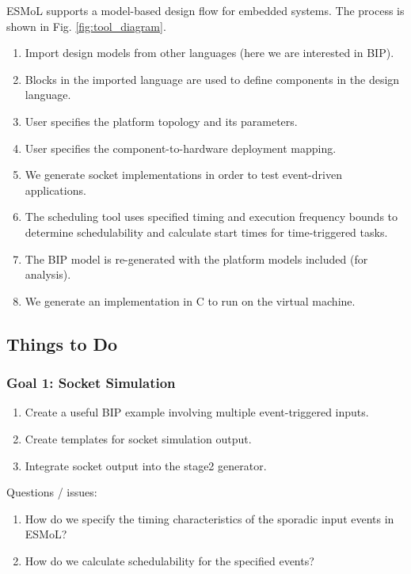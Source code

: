 ESMoL supports a model-based design flow for embedded systems.  The process is shown in Fig. \ref{fig:tool_diagram}.

\begin{enumerate}
\item Import design models from other languages (here we are interested in BIP). 
\item Blocks in the imported language are used to define components in the design language.
\item User specifies the platform topology and its parameters.
\item User specifies the component-to-hardware deployment mapping.
\item We generate socket implementations in order to test event-driven applications.
\item The scheduling tool uses specified timing and execution frequency bounds to determine schedulability and calculate start times for time-triggered tasks.
\item The BIP model is re-generated with the platform models included (for analysis).
\item We generate an implementation in C to run on the virtual machine.
\end{enumerate}

\subsection{Things to Do}

\subsubsection{Goal 1: Socket Simulation}
\begin{enumerate}
\item Create a useful BIP example involving multiple event-triggered inputs.
\item Create templates for socket simulation output.
\item Integrate socket output into the stage2 generator.
\end{enumerate}

Questions / issues:

\begin{enumerate}
\item How do we specify the timing characteristics of the sporadic input events in ESMoL?
\item How do we calculate schedulability for the specified events?
\end{enumerate}

